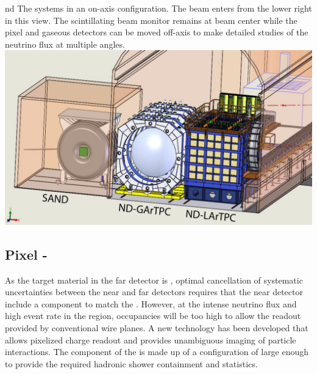\documentclass[../main-v1.tex]{subfiles}
\begin{document}
 
 \begin{dunefigure}
{nd}
{The  systems in an on-axis configuration.  The beam enters from the lower right in this view. The  scintillating beam monitor remains at beam center while the pixel %
 and gaseous   detectors can be moved off-axis to make detailed studies of the neutrino flux at multiple angles.}
\includegraphics[height=0.5\textwidth]{graphics/IntroFigures/All3Detectors.pdf}
\end{dunefigure}

 \subsection{Pixel  -  }
 
 As the target material in the %
 far detector is , optimal cancellation of systematic uncertainties between the near and far detectors requires that the near detector include a   component to match the .  However, at the intense neutrino flux and high event rate in the  region, occupancies will be too high to allow the \twod readout provided by conventional wire planes. A new   technology has been developed that allows pixelized charge readout  and provides unambiguous \threed imaging of  particle interactions.  The  component of the  is made up of a configuration of     large enough to provide the required hadronic shower containment and statistics.  %
 
\end{document}
